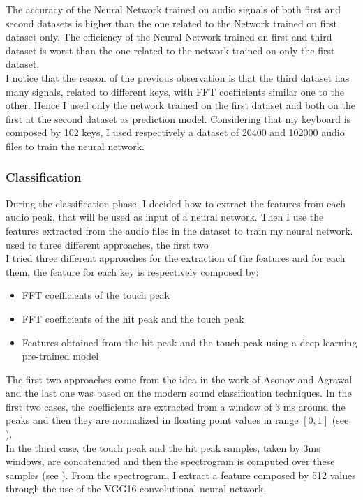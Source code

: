 The accuracy of the Neural Network trained on audio signals of both first and second datasets is higher than the one related to the Network trained on first dataset only. The efficiency of the Neural Network trained on first and third dataset is worst than the one related to the network trained on only the first dataset.\\
I notice that the reason of the previous observation is that the third dataset has many signals, related to different keys, with FFT coefficients similar one to the other. Hence I used only the network trained on the first dataset and both on the first at the second dataset as prediction model. Considering that my keyboard is composed by 102 keys, I used respectively a dataset of 20400 and 102000 audio files to train the neural network.

\subsubsection{Classification}\label{AcCAPPCHA:classification}
During the classification phase, I decided how to extract the features from each audio peak, that will be used as input of a neural network. Then I use the features extracted from the audio files in the dataset to train my neural network. used to three different approaches, the first two \\
I tried three different approaches for the extraction of the features and for each them, the feature for each key is respectively composed by:
\begin{itemize}
\item{FFT coefficients of the touch peak}
\item{FFT coefficients of the hit peak and the touch peak}
\item{Features obtained from the hit peak and the touch peak using a deep learning pre-trained model}
\end{itemize}
The first two approaches come from the idea in the work of Asonov and Agrawal and the last one was based on the modern sound classification techniques. In the first two cases, the coefficients are extracted from a window of 3 ms around the peaks and then they are normalized in floating point values in range $[0, 1]$ (see ).\\
In the third case, the touch peak and the hit peak samples, taken by 3ms windows, are concatenated and then the spectrogram is computed over these samples (see ). From the spectrogram, I extract a feature composed by 512 values through the use of the VGG16 convolutional neural network.\\
